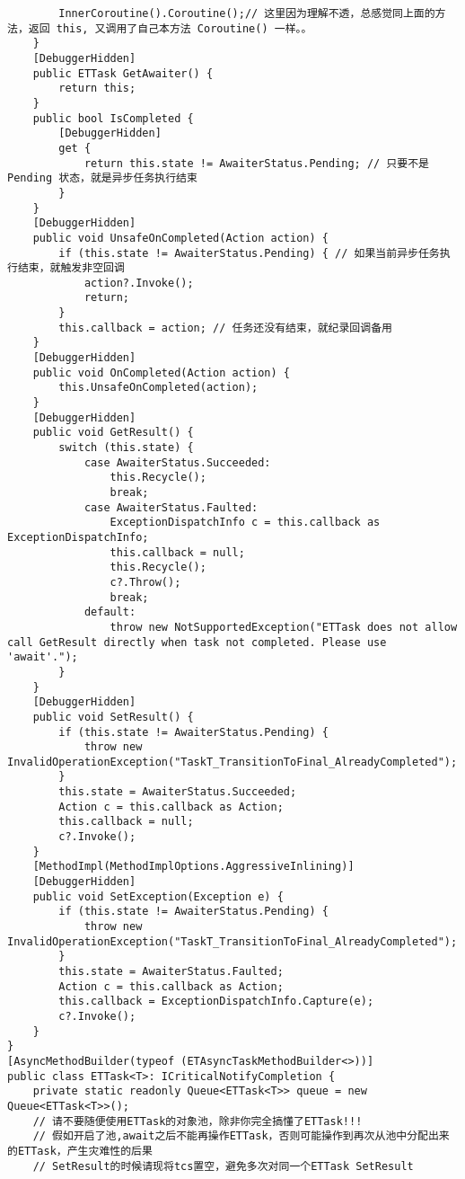 \documentclass[9pt, b5paper]{article}
\begin{document}
\begin{itemize}
\begin{verbatim}
        InnerCoroutine().Coroutine();// 这里因为理解不透，总感觉同上面的方法，返回 this, 又调用了自己本方法 Coroutine() 一样。。
    }
    [DebuggerHidden]
    public ETTask GetAwaiter() {
        return this;
    }
    public bool IsCompleted {
        [DebuggerHidden]
        get {
            return this.state != AwaiterStatus.Pending; // 只要不是 Pending 状态，就是异步任务执行结束
        }
    }
    [DebuggerHidden]
    public void UnsafeOnCompleted(Action action) {
        if (this.state != AwaiterStatus.Pending) { // 如果当前异步任务执行结束，就触发非空回调
            action?.Invoke();
            return;
        }
        this.callback = action; // 任务还没有结束，就纪录回调备用
    }
    [DebuggerHidden]
    public void OnCompleted(Action action) {
        this.UnsafeOnCompleted(action);
    }
    [DebuggerHidden]
    public void GetResult() {
        switch (this.state) {
            case AwaiterStatus.Succeeded:
                this.Recycle();
                break;
            case AwaiterStatus.Faulted:
                ExceptionDispatchInfo c = this.callback as ExceptionDispatchInfo;
                this.callback = null;
                this.Recycle();
                c?.Throw();
                break;
            default:
                throw new NotSupportedException("ETTask does not allow call GetResult directly when task not completed. Please use 'await'.");
        }
    }
    [DebuggerHidden]
    public void SetResult() {
        if (this.state != AwaiterStatus.Pending) {
            throw new InvalidOperationException("TaskT_TransitionToFinal_AlreadyCompleted");
        }
        this.state = AwaiterStatus.Succeeded;
        Action c = this.callback as Action;
        this.callback = null;
        c?.Invoke();
    }
    [MethodImpl(MethodImplOptions.AggressiveInlining)]
    [DebuggerHidden]
    public void SetException(Exception e) {
        if (this.state != AwaiterStatus.Pending) {
            throw new InvalidOperationException("TaskT_TransitionToFinal_AlreadyCompleted");
        }
        this.state = AwaiterStatus.Faulted;
        Action c = this.callback as Action;
        this.callback = ExceptionDispatchInfo.Capture(e);
        c?.Invoke();
    }
}
[AsyncMethodBuilder(typeof (ETAsyncTaskMethodBuilder<>))]
public class ETTask<T>: ICriticalNotifyCompletion {
    private static readonly Queue<ETTask<T>> queue = new Queue<ETTask<T>>();
    // 请不要随便使用ETTask的对象池，除非你完全搞懂了ETTask!!!
    // 假如开启了池,await之后不能再操作ETTask，否则可能操作到再次从池中分配出来的ETTask，产生灾难性的后果
    // SetResult的时候请现将tcs置空，避免多次对同一个ETTask SetResult

\end{verbatim}
\end{itemize}
\end{document}
